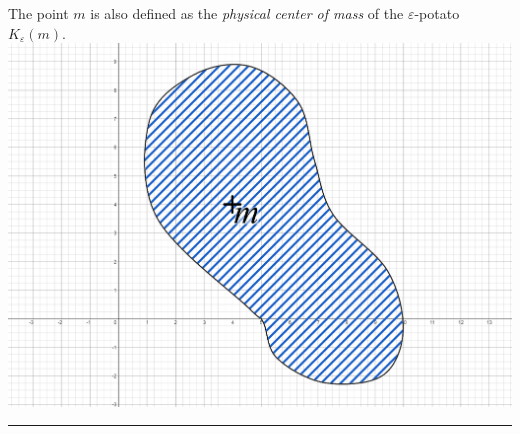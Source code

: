 \documentclass[pdftex,12pt,a4paper]{report}
\begin{document}
    \newline
    The point $ m $ is also defined as the \emph{physical center of mass} of the $\varepsilon$-potato $ K_{\varepsilon}(m) $.
    \\
    \includegraphics[width=\textwidth]{./potato-grid.png}
    \\
    \vspace{5mm} \hrule
    \newpage
\end{document}
